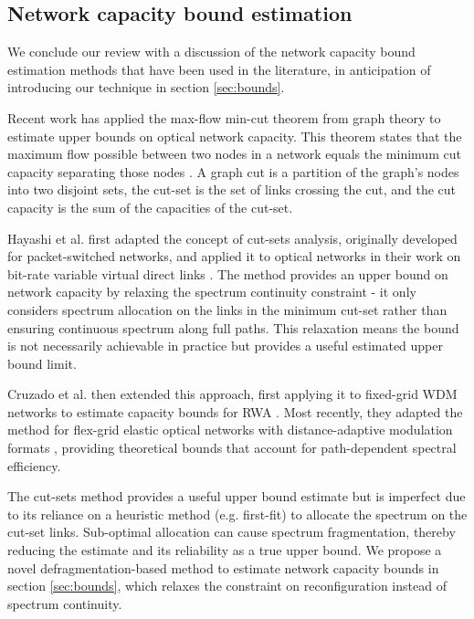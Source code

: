 \subsection{Network capacity bound estimation}
\label{sec:survey-capacity_bounds}

We conclude our review with a discussion of the network capacity bound estimation methods that have been used in the literature, in anticipation of introducing our technique in section \ref{sec:bounds}.

Recent work has applied the max-flow min-cut theorem from graph theory to estimate upper bounds on optical network capacity. This theorem states that the maximum flow possible between two nodes in a network equals the minimum cut capacity separating those nodes \cite{ford_maximal_1956}. A graph cut is a partition of the graph's nodes into two disjoint sets, the cut-set is the set of links crossing the cut, and the cut capacity is the sum of the capacities of the cut-set.

Hayashi et al. first adapted the concept of cut-sets analysis, originally developed for packet-switched networks, and applied it to optical networks in their work on bit-rate variable virtual direct links \cite{hayashi_efficient_2022,hayashi_cost-effective_2023}. The method provides an upper bound on network capacity by relaxing the spectrum continuity constraint - it only considers spectrum allocation on the links in the minimum cut-set rather than ensuring continuous spectrum along full paths. This relaxation means the bound is not necessarily achievable in practice but provides a useful estimated upper bound limit. 

Cruzado et al. then extended this approach, first applying it to fixed-grid WDM networks to estimate capacity bounds for RWA \cite{cruzado_effective_2023}.  Most recently, they adapted the method for flex-grid elastic optical networks with distance-adaptive modulation formats \cite{cruzado_capacity-bound_2024}, providing theoretical bounds that account for path-dependent spectral efficiency.

The cut-sets method provides a useful upper bound estimate but is imperfect due to its reliance on a heuristic method (e.g. first-fit) to allocate the spectrum on the cut-set links. Sub-optimal allocation can cause spectrum fragmentation, thereby reducing the estimate and its reliability as a true upper bound. We propose a novel defragmentation-based method to estimate network capacity bounds in section \ref{sec:bounds}, which relaxes the constraint on reconfiguration instead of spectrum continuity.
